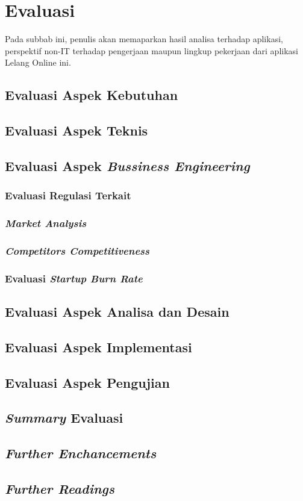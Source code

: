 \section{Evaluasi}
	Pada subbab ini, penulis akan memaparkan hasil analisa terhadap aplikasi, perspektif non-IT terhadap pengerjaan maupun lingkup pekerjaan dari aplikasi Lelang Online ini.
	
	\subsection{Evaluasi Aspek Kebutuhan}
	
	\subsection{Evaluasi Aspek Teknis}
	\subsection{Evaluasi Aspek \textit{Bussiness Engineering}}
	
		\subsubsection{Evaluasi Regulasi Terkait}
		
		\subsubsection{\textit{Market Analysis}}
		
		\subsubsection{\textit{Competitors Competitiveness}}
		
		\subsubsection{Evaluasi \textit{Startup Burn Rate}}
		
	\subsection{Evaluasi Aspek Analisa dan Desain}
	\subsection{Evaluasi Aspek Implementasi}
	\subsection{Evaluasi Aspek Pengujian}
	
	\subsection{\textit{Summary} Evaluasi}
	
	\subsection{\textit{Further Enchancements}}  
	\subsection{\textit{Further Readings}}

	